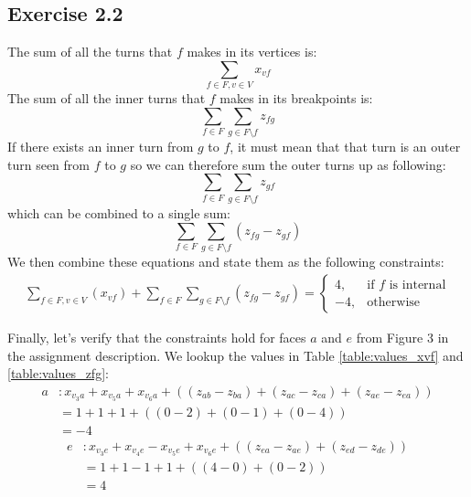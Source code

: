 \documentclass[12pt]{article}
\begin{document}
\subsection*{Exercise 2.2}
  
  The sum of all the turns that $f$ makes in its vertices is:
  $$\sum_{f \in F, v \in V}{x_{vf}}$$
  The sum of all the inner turns that $f$ makes in its breakpoints is:
  $$\sum_{f \in F}\sum_{g \in F \setminus f}z_{fg}$$
  If there exists an inner turn from $g$ to $f$, it must mean that that turn is an outer turn seen from $f$ to $g$ so we can therefore sum the outer turns up as following:
  $$\sum_{f \in F}\sum_{g \in F \setminus f}z_{gf}$$
  which can be combined to a single sum:
  $$\sum_{f \in F}\sum_{g \in F \setminus f}(z_{fg} - z_{gf})$$
  We then combine these equations and state them as the following constraints:
  \begin{align*}
      \sum_{f \in F, v \in V}(x_{vf}) + \sum_{f \in F}\sum_{g \in F \setminus f}(z_{fg} - z_{gf}) = \begin{cases}
                                                                                       4, & \text{if } f \text{ is internal}\\
                                                                                      -4, & \text{otherwise}
                                                                                   \end{cases}
  \end{align*}

  Finally, let's verify that the constraints hold for faces $a$ and $e$ from Figure 3 in the assignment description. We lookup the values in Table \ref{table:values_xvf} and \ref{table:values_zfg}:
  \begin{align*}
    a &: x_{v_{3}a} + x_{v_{5}a} + x_{v_{6}a} + ((z_{ab} - z_{ba}) + (z_{ac} - z_{ca}) + (z_{ae} - z_{ea}))\\
      &= 1 + 1 + 1 + ((0 - 2) + (0 - 1) + (0 - 4)) \\
      &= -4
  \end{align*}
  \begin{align*}
    e &: x_{v_{3}e} + x_{v_{4}e} - x_{v_{5}e} + x_{v_{6}e} + ((z_{ea} - z_{ae}) + (z_{ed} - z_{de}))\\
      &= 1 + 1 -1 + 1 + ((4 - 0) + (0 - 2)) \\
      &= 4
  \end{align*}
\end{document}
